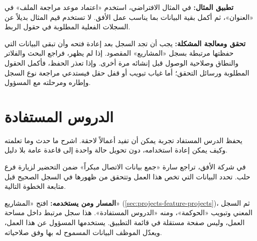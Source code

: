 \textbf{تطبيق المثال:} في المثال الافتراضي، استخدم «اعتماد موعد مراجعة الملف» في «العنوان»، ثم أكمل بقية البيانات بما يناسب عمل الأفق. لا تستخدم قيم المثال بديلاً عن السجلات الفعلية المطلوبة في حقول الربط.

\textbf{تحقق ومعالجة المشكلة:} يجب أن تجد السجل بعد إعادة فتحه وأن تبقى البيانات التي حفظتها مرتبطة بسجل «المشاريع» المقصود. إذا لم يظهر، فراجع البحث والفلاتر والنطاق وصلاحية الوصول قبل إنشائه مرة أخرى. وإذا تعذر الحفظ، فأكمل الحقول المطلوبة ورسائل التحقق؛ أما غياب تبويب أو قفل حقل فيستدعي مراجعة نوع السجل وإطاره ومرحلته مع المسؤول.

\clearpage
\section{الدروس المستفادة}
\label{sec:projects-feature-lessons-learned}

يحفظ الدرس المستفاد تجربة يمكن أن تفيد أعمالاً لاحقة. اشرح ما حدث وما تعلمته وكيف يمكن إعادة استخدامه، دون تحويل حالة واحدة إلى قاعدة عامة بلا دليل.

\begin{rcnote}
في شركة الأفق، تراجع سارة «جمع بيانات الاتصال مبكراً» ضمن التحضير لزيارة فرع حلب. تحدد البيانات التي تخص هذا العمل وتتحقق من ظهورها في السجل الصحيح قبل متابعة الخطوة التالية.
\end{rcnote}

\textbf{المسار ومن يستخدمه:} افتح «المشاريع» (\ref{sec:projects-feature-projects})، ثم السجل المعني وتبويب «الحوكمة»، ومنه «الدروس المستفادة». هذا سجل مرتبط داخل مساحة العمل، وليس صفحة مستقلة في قائمة التطبيق. يستخدمها المسؤول عن هذا العمل، ويعدّل الموظف البيانات المسموح له بها وفق صلاحياته.

